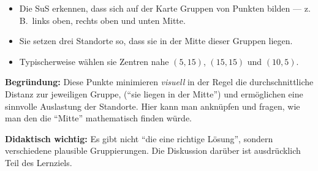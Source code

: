 \begin{aufgabe}{2}
\begin{itemize}
  \item Die SuS erkennen, dass sich auf der Karte Gruppen von Punkten bilden — z.\,B.\ links oben, rechts oben und unten Mitte.
  \item Sie setzen drei Standorte so, dass sie in der Mitte dieser Gruppen liegen.
  \item Typischerweise wählen sie Zentren nahe $(5,15)$, $(15,15)$ und $(10,5)$.
\end{itemize}

\textbf{Begründung:} Diese Punkte minimieren \textit{visuell} in der Regel die durchschnittliche Distanz zur jeweiligen Gruppe, (``sie liegen in der Mitte'') und ermöglichen eine sinnvolle Auslastung der Standorte. Hier kann man anknüpfen und fragen, wie man den die ``Mitte'' mathematisch finden würde.

\textbf{Didaktisch wichtig:} Es gibt nicht ``die eine richtige Lösung'', sondern verschiedene plausible Gruppierungen. Die Diskussion darüber ist ausdrücklich Teil des Lernziels.
\end{aufgabe}








